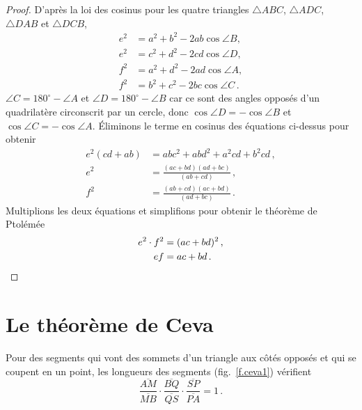 \begin{proof}
D'après la loi des cosinus pour les quatre triangles  $\triangle ABC$, $\triangle ADC$, $\triangle DAB$ et $\triangle DCB$,
\begin{align*}
e^2 &= a^2 + b^2 - 2ab \cos \angle B,\\
e^2 &= c^2 + d^2 - 2cd \cos \angle D,\\
f^2 &= a^2 + d^2 - 2ad \cos \angle A,\\
f^2 &= b^2 + c^2 - 2bc \cos \angle C\,.
\end{align*}
$\angle C = 180^\circ - \angle A$ et $\angle D = 180^\circ - \angle B$ car ce sont des angles opposés d'un quadrilatère circonscrit par un cercle, donc $\cos \angle D = - \cos \angle B$ et $\cos \angle C = -\cos \angle A$. Éliminons le terme en cosinus des équations ci-dessus pour obtenir 
\begin{align*}
e^2(cd+ab)&=abc^2+abd^2+a^2cd+b^2cd\,,\\
e^2 &= \frac{(ac+bd)(ad+bc)}{(ab+cd)}\,,\\
f^2 &= \frac{(ab+cd)(ac+bd)}{(ad+bc)}\,.
\end{align*}
Multiplions les deux équations et simplifions pour obtenir le théorème de Ptolémée 
\begin{align*}
e^2\cdot f^2 &= (ac+bd)^2\,,\\
ef &= ac+bd\,.\qedhere
\end{align*}
\end{proof}


\section{Le théorème de Ceva}\label{a.ceva}

\begin{theorem}[Ceva]
Pour des segments  qui vont des sommets d'un triangle aux côtés opposés et qui se coupent en un point, les longueurs des segments (fig.~\ref{f.ceva1}) vérifient 
  \label{thm.ceva}
\[
\frac{\overline{AM}}{\overline{MB}}\cdot\frac{\overline{BQ}}{\overline{QS}}\cdot\frac{\overline{SP}}{\overline{PA}} = 1\,.
\]
\end{theorem}

